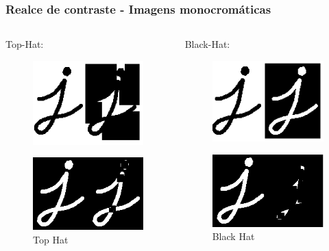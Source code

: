 \documentclass[aspectratio=169]{beamer}
\theoremstyle{Definition}
\begin{document}
\begin{frame}
	\frametitle{Realce de contraste - Imagens monocromáticas}

	
	\begin{columns}
		\begin{column}{0.5\textwidth}
		Top-Hat: 
			\begin{figure}[h]
	  		 	\includegraphics[height=0.2\paperheight]{imagens/tophat}
			\end{figure}
			\begin{figure}[h]
	  		 	\includegraphics[height=0.2\paperheight]{imagens/tophat1}
				\caption{Top Hat}\label{figCont1}
			\end{figure}
		\end{column}
		\begin{column}{0.5\textwidth}
		Black-Hat:
			\begin{figure}[h]
			   	\includegraphics[height=0.2\paperheight]{imagens/blackhat}
			\end{figure}
			\begin{figure}[h]
	  		 	\includegraphics[height=0.2\paperheight]{imagens/blackhat1}
				\caption{Black Hat}\label{figCont2}
			\end{figure}
		\end{column}
	\end{columns}
	
\end{frame}
\end{document}
